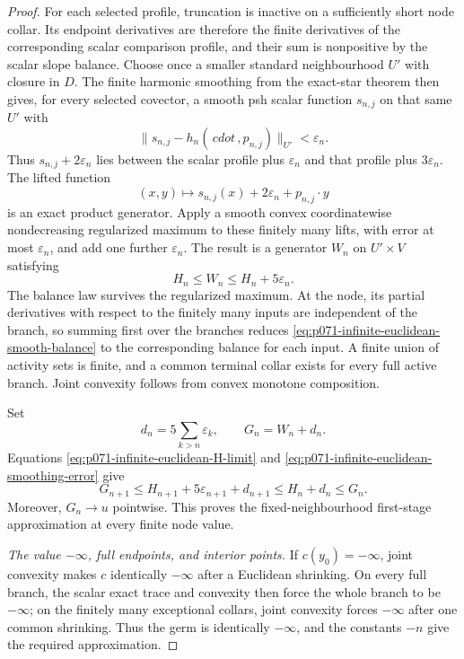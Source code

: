 \begin{proof}
For each selected profile, truncation is inactive on a sufficiently short
node collar.  Its endpoint derivatives are therefore the finite derivatives
of the corresponding scalar comparison profile, and their sum is
nonpositive by the scalar slope balance.  Choose once a smaller standard
neighbourhood $U'$ with closure in $D$.  The finite harmonic smoothing
from the exact-star theorem then gives, for every selected covector, a smooth
psh scalar function $s_{n,j}$ on that same $U'$ with
\[
 \bigl\lVert s_{n,j}-h_n(\,cdot\,,p_{n,j})\bigr\rVert_{U'}
 <\varepsilon_n.
\]
Thus $s_{n,j}+2\varepsilon_n$ lies between the scalar profile plus
$\varepsilon_n$ and that profile plus $3\varepsilon_n$.  The lifted
function
\[
 (x,y)\longmapsto
 s_{n,j}(x)+2\varepsilon_n+p_{n,j}\mathbin\cdot y
\]
is an exact product generator.  Apply a smooth convex coordinatewise
nondecreasing regularized maximum to these finitely many lifts, with error
at most $\varepsilon_n$, and add one further $\varepsilon_n$.  The
result is a generator $W_n$ on $U'\times V$ satisfying
\begin{equation}
                         H_n\leq W_n\leq H_n+5\varepsilon_n.
 \label{eq:p071-infinite-euclidean-smoothing-error}
\end{equation}
The balance law survives the regularized maximum.  At the node, its partial
derivatives with respect to the finitely many inputs are independent of the
branch, so summing first over the branches reduces
\eqref{eq:p071-infinite-euclidean-smooth-balance} to the corresponding
balance for each input.  A finite union of activity sets is finite, and a
common terminal collar exists for every full active branch.  Joint
convexity follows from convex monotone composition.

Set
\[
 d_n=5\sum_{k>n}\varepsilon_k,
 \qquad G_n=W_n+d_n.
\]
Equations \eqref{eq:p071-infinite-euclidean-H-limit} and
\eqref{eq:p071-infinite-euclidean-smoothing-error} give
\[
 G_{n+1}\leq H_{n+1}+5\varepsilon_{n+1}+d_{n+1}
 \leq H_n+d_n\leq G_n.
\]
Moreover, $G_n\to u$ pointwise.  This proves the fixed-neighbourhood
first-stage approximation at every finite node value.

\medskip\noindent
\emph{The value $-\infty$, full endpoints, and interior points.}
If $c(y_0)=-\infty$, joint convexity makes $c$ identically
$-\infty$ after a Euclidean shrinking.  On every full branch, the scalar
exact trace and convexity then force the whole branch to be
$-\infty$; on the finitely many exceptional collars, joint convexity
forces $-\infty$ after one common shrinking.  Thus the germ is
identically $-\infty$, and the constants $-n$ give the required
approximation.


\end{proof}

